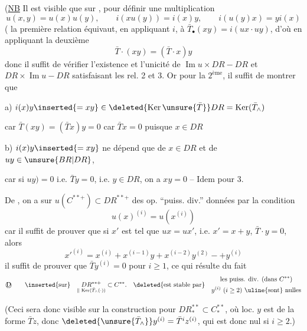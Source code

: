(\uline{NB} Il est visible que sur  , pour définir
 une multiplication
\[
u(x,y)=u(x)u(y),\qquad i(xu(y))=i(x)y,\qquad i(u(y)x)=yi(x)
\]
( la première relation équivaut, en appliquant $i$, à
$\bar T_\bullet(xy)=i(ux\cdot uy)$, d'où en appliquant la deuxième
\[
\bar T\cdot(xy)=(\bar T\cdot x)y
\]
donc il suffit de vérifier l'existence et l'unicité de
$\operatorname{Im}u\times DR-DR$ et $DR\times\operatorname{Im}u-DR$
satisfaisant les rel. 2 et 3. Or pour la $2^{\text{ème}}$, il suffit de montrer que

a) $i(x)y\inserted{=xy}\in\deleted{\operatorname{Ker}\unsure{\bar T}}DR=\operatorname{Ker}(\bar T_\wedge)$

car $\bar T(xy)=(\bar T x)y=0$ car $\bar T x=0$ puisque $x\in DR$

b) $i(x)y\inserted{=xy}$ ne dépend que de $x\in DR$ et de $uy\in\unsure{BR|DR}$,

car si $uy)=0$ i.e. $\bar T y=0$, i.e. $y\in DR$, on a
$xy=0$ -- Idem pour 3.

De , on a sur $u(C^{**+})\subset DR^{**+}$ des op.
``puiss. div.''  données par la condition
\[
u(x)^{(i)}=u(x^{(i)})
\]
car il suffit de prouver que si $x'$ est tel que
$ux=ux'$, i.e. $x'=x+y$, $\bar T\cdot y=0$, alors
\[
x'^{(i)}=x^{(i)}+x^{(i-1)}y+x^{(i-2)}y^{(2)}-+y^{(i)}
\]
il suffit de prouver que $\bar T y^{(i)}=0$ pour $i\geq1$,
ce qui résulte du fait 
\[
\text{\textcircled{D}}\qquad
\inserted{\text{sur}}\quad
\underset{\Vert\,\operatorname{Ker}(\bar T_\wedge(\cdot))}{DR^{**+}}\subset C^{**}.
\quad\deleted{\text{est stable par}}
\quad\begin{gathered}
\text{les puiss. div. (dans }C^{**}\text{)}\\
y^{(i)}\ (i\geq2)\ \text{\uline{sont} nulles}
\end{gathered}
\]

(Ceci sera donc visible sur la construction pour $DR_*^{**}\subset C_*^{**}$,
où loc. $y$ est de la forme $\bar Tz$, donc
$\deleted{\unsure{\bar T_\wedge}}y^{(i)}=\bar T^i z^{(i)}$,
qui est donc nul si $i\geq2$.)

